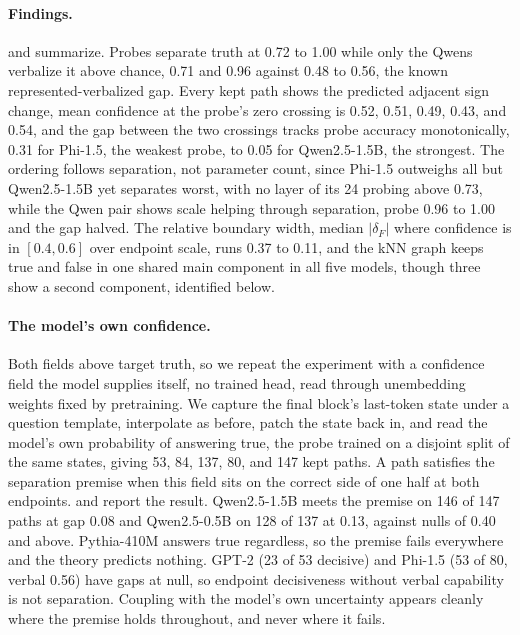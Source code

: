 \documentclass[mlmain,onecolumn]{jmlr}
\newcommand{\dF}{\delta_{\!F}}
\begin{document}
\paragraph{Findings.}
 and  summarize.
Probes separate truth at 0.72 to 1.00 while only the Qwens
verbalize it above chance, 0.71 and 0.96 against 0.48 to 0.56, the
known represented-verbalized gap. Every kept path shows the
predicted adjacent sign change, mean confidence at the probe's zero
crossing is 0.52, 0.51, 0.49, 0.43, and 0.54, and the gap between
the two crossings tracks probe accuracy monotonically, 0.31 for
Phi-1.5, the weakest probe, to 0.05 for Qwen2.5-1.5B, the
strongest. The ordering follows separation, not parameter count,
since Phi-1.5 outweighs all but Qwen2.5-1.5B yet separates worst,
with no layer of its 24 probing above 0.73, while the Qwen pair
shows scale helping through separation, probe 0.96 to 1.00 and the
gap halved. The relative boundary width, median $|\dF|$ where
confidence is in $[0.4, 0.6]$ over endpoint scale, runs 0.37 to
0.11, and the kNN graph keeps true and false in one shared main
component in all five models, though three show a second component,
identified below.

\paragraph{The model's own confidence.}
Both fields above target truth, so we repeat the experiment with a
confidence field the model supplies itself, no trained head, read
through unembedding weights fixed by pretraining. We capture the
final block's last-token state under a question template,
interpolate as before, patch the state back in, and read the
model's own probability of answering true, the probe trained on a
disjoint split of the same states, giving 53, 84, 137, 80, and 147
kept paths. A path satisfies the separation premise when this field
sits on the correct side of one half at both endpoints.  and  report
the result. Qwen2.5-1.5B meets the premise on 146 of 147 paths at
gap 0.08 and Qwen2.5-0.5B on 128 of 137 at 0.13, against nulls of
0.40 and above. Pythia-410M answers true regardless, so the premise
fails everywhere and the theory predicts nothing. GPT-2 (23 of 53
decisive) and Phi-1.5 (53 of 80, verbal 0.56) have gaps at null, so
endpoint decisiveness without verbal capability is not separation.
Coupling with the model's own uncertainty appears cleanly where the
premise holds throughout, and never where it fails.
\end{document}
